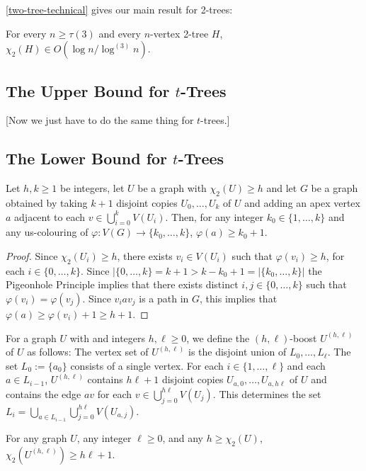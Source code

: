 \documentclass[kpfonts]{patmorin}
\newcommand{\uqs}{\chi_2}
\begin{document}
\cref{two-tree-technical} gives our main result for 2-trees:

\begin{thm}
    For every $n\ge \tau(3)$ and every $n$-vertex 2-tree $H$, $\uqs(H)\in O(\log n/\log^{(3)} n)$.
\end{thm}


\subsection{The Upper Bound for $t$-Trees}

[Now we just have to do the same thing for $t$-trees.]

\subsection{The Lower Bound for $t$-Trees}

\begin{lem}\label{apex-graph}
    Let $h,k\ge 1$ be integers, let $U$ be a graph with $\uqs(U)\ge h$ and let $G$ be a graph obtained by taking $k+1$ disjoint copies $U_0,\ldots,U_k$ of $U$ and adding an apex vertex $a$ adjacent to each $v\in\bigcup_{i=0}^k V(U_i)$.  Then, for any integer $k_0\in \{1,\ldots,k\}$ and any us-colouring of $\varphi:V(G)\to\{k_0,\ldots,k\}$, $\varphi(a) \ge k_0+1$.
\end{lem}

\begin{proof}
    Since $\uqs(U_i)\ge h$, there exists $v_i\in V(U_i)$ such that $\varphi(v_i)\ge h$, for each $i\in\{0,\ldots,k\}$.  Since $|\{0,\ldots,k\}=k+1>k-k_0+1=|\{k_0,\ldots,k\}|$ the Pigeonhole Principle implies that there exists distinct $i,j\in\{0,\ldots,k\}$ such that $\varphi(v_i)=\varphi(v_j)$.  Since $v_i a v_j$ is a path in $G$, this implies that $\varphi(a)\ge \varphi(v_i)+1\ge h+1$.
\end{proof}

For a graph $U$ with and integers $h,\ell\ge 0$, we define the $(h,\ell)$-boost $U^{(h,\ell)}$ of $U$ as follows: The vertex set of $U^{(h,\ell)}$ is the disjoint union of $L_0,\ldots,L_\ell$.  The set $L_0:=\{a_0\}$ consists of a single vertex. For each $i\in\{1,\ldots,\ell\}$ and each $a\in L_{i-1}$, $U^{(h,\ell)}$ contains $h\ell+1$ disjoint copies $U_{a,0},\ldots,U_{a,h\ell}$ of $U$ and contains the edge $av$ for each $v\in\bigcup_{j=0}^{h\ell} V(U_j)$.  This determines the set $L_i=\bigcup_{a\in L_{i-1}}\bigcup_{j=0}^{h\ell} V(U_{a,j})$.

\begin{lem}\label{boost}
    For any graph $U$, any integer $\ell\ge 0$, and any $h\ge\uqs(U)$, $\uqs(U^{(h,\ell)})\ge h\ell +1$.
\end{lem}
\end{document}
